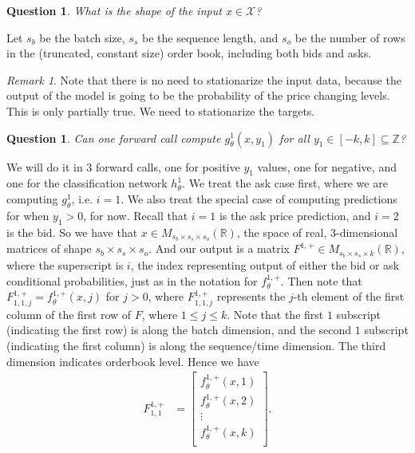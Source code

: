 \documentclass[12pt, reqno]{amsart}
\theoremstyle{definition}
\theoremstyle{definition}
\theoremstyle{plain}
\newtheorem{Ques}[theorem]{Question}
\theoremstyle{definition}
\theoremstyle{remark}
\newtheorem{rem}[theorem]{Remark}
\newcommand{\sub}{\subseteq}				%
\newcommand{\R}{\mathbb{R}}				%
\newcommand{\z}{\mathbb{Z}}				%
\newcommand{\bee}{\begin{equation}\begin{aligned}}
\newcommand{\eee}{\end{aligned}\end{equation}}
\renewcommand{\leq}{\leqslant}			%
\renewcommand{\'}{\hspace{0.5mm}'}			%
\begin{document}
\begin{Ques}
	What is the shape of the input $x \in \mathcal{X}$?
\end{Ques}

Let $s_b$ be the batch size, $s_s$ be the sequence length, and $s_o$ be the number of rows in the (truncated, constant size) order book, including both bids and asks. 

\begin{rem}
	Note that there is no need to stationarize the input data, because the output of the model is going to be the probability of the price changing levels. This is only partially true. We need to stationarize the targets. 
\end{rem}

\begin{Ques}
	Can one forward call compute $g_\theta^1(x,y_1)$ for all $y_1 \in [-k, k] \sub \z$? 
\end{Ques}

We will do it in 3 forward calls, one for positive $y_1$ values, one for negative, and one for the classification network $h_\theta^1$. We treat the ask case first, where we are computing $g_\theta^1$, i.e. $i = 1$. We also treat the special case of computing predictions for when $y_1 > 0$, for now. Recall that $i = 1$ is the ask price prediction, and $i = 2$ is the bid. So we have that $x \in M_{s_b \times s_s \times s_o} (\R)$, the space of real, $3$-dimensional matrices of shape $s_b \times s_s \times s_o$. And our output is a matrix $F^{1,+} \in M_{s_b \times s_s \times k} (\R)$, where the superscript is $i$, the index representing output of either the bid or ask conditional probabilities, just as in the notation for $f_\theta^{1,+}$. Then note that $F^{1,+}_{1, 1, j} = f_\theta^{1,+}(x,j)$ for $j > 0$, where $F^{1,+}_{1, 1, j}$ represents the $j$-th element of the first column of the first row of $F$, where $1 \leq j \leq k$. Note that the first $1$ subscript (indicating the first row) is along the batch dimension, and the second $1$ subscript (indicating the first column) is along the sequence/time dimension. The third dimension indicates orderbook level. Hence we have
\bee
	F^{1,+}_{1,1}
	&=
	\begin{bmatrix}
		f_\theta^{1,+}(x,1) \\
		f_\theta^{1,+}(x,2) \\
		\vdots \\
		f_\theta^{1,+}(x,k) \\
	\end{bmatrix}. 
\eee
\end{document}
